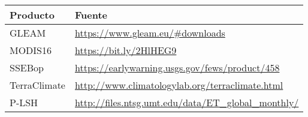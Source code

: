 \begin{table}[htb]
\label{tab:Table_AE_products_source}
\centering
\begin{tabular}{ll}
\hline
Producto     & Fuente                                                                     \\ \hline
GLEAM        & \url{https://www.gleam.eu/#downloads}                   \\
MODIS16      & \url{https://bit.ly/2HlHEG9}  \\
SSEBop       & \url{https://earlywarning.usgs.gov/fews/product/458}      \\
TerraClimate & \url{http://www.climatologylab.org/terraclimate.html}     \\
P-LSH        & \url{http://files.ntsg.umt.edu/data/ET_global_monthly/} \\
\hline
\end{tabular}
\end{table}